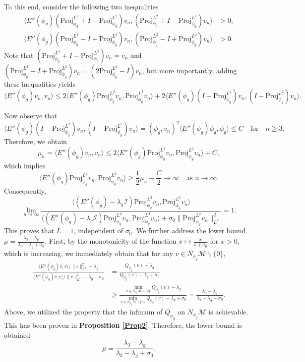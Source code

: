 \documentclass[preprint,3p]{elsarticle}
\begin{document}
To this end, consider the following two inequalities
\begin{align*}
	\langle E''(\phi_g) (\text{Proj}_{\phi_g}^{L^2} + I - \text{Proj}_{\phi_g}^{L^2}) v_n, (\text{Proj}_{\phi_g}^{L^2} + I - \text{Proj}_{\phi_g}^{L^2}) v_n \rangle &> 0, \\
	\langle E''(\phi_g) (\text{Proj}_{\phi_g}^{L^2} - I + \text{Proj}_{\phi_g}^{L^2}) v_n, (\text{Proj}_{\phi_g}^{L^2} - I + \text{Proj}_{\phi_g}^{L^2}) v_n \rangle &> 0.
\end{align*}
Note that $(\text{Proj}_{\phi_g}^{L^2} + I - \text{Proj}_{\phi_g}^{L^2})v_n = v_n$ and $(\text{Proj}_{\phi_g}^{L^2} - I + \text{Proj}_{\phi_g}^{L^2})v_n = (2\text{Proj}_{\phi_g}^{L^2} - I)v_n$, but more importantly, adding these inequalities yields
\[
\langle E''(\phi_g) v_n, v_n \rangle \leq 2 \langle E''(\phi_g) \text{Proj}_{\phi_g}^{L^2} v_n, \text{Proj}_{\phi_g}^{L^2} v_n \rangle + 2 \langle E''(\phi_g) (I - \text{Proj}_{\phi_g}^{L^2}) v_n, (I - \text{Proj}_{\phi_g}^{L^2}) v_n \rangle.
\]

Now observe that
\[
\langle E''(\phi_g) (I - \text{Proj}_{\phi_g}^{L^2}) v_n, (I - \text{Proj}_{\phi_g}^{L^2}) v_n \rangle = (\phi_g, v_n)^2 \langle E''(\phi_g) \phi_g, \phi_g \rangle\le C\quad \text{for}\quad n\ge3.
\]
Therefore, we obtain
\[
\mu_n = \langle E''(\phi_g) v_n, v_n \rangle \leq 2 \langle E''(\phi_g) \text{Proj}_{\phi_g}^{L^2} v_n, \text{Proj}_{\phi_g}^{L^2} v_n \rangle + C,
\]
which implies
\[
\langle E''(\phi_g) \text{Proj}_{\phi_g}^{L^2} v_n, \text{Proj}_{\phi_g}^{L^2} v_n \rangle \geq \frac{1}{2} \mu_n - \frac{C}{2} \to \infty \quad \text{as } n \to \infty.
\]
Consequently,
\[
\lim_{n \to \infty} \frac{\langle (E''(\phi_g) - \lambda_g \mathcal{I}) \text{Proj}_{\phi_g}^{L^2} v_n, \text{Proj}_{\phi_g}^{L^2} v_n \rangle}{\langle (E''(\phi_g) - \lambda_g \mathcal{I}) \text{Proj}_{\phi_g}^{L^2} v_n, \text{Proj}_{\phi_g}^{L^2} v_n \rangle + \sigma_0 \|\text{Proj}_{\phi_g}^{L^2} v_n\|_{L^2}^2} = 1.
\]
This proves that $L = 1$, independent of $\sigma_0$. We further address the lower bound $\mu = \frac{\lambda_3 - \lambda_g}{\lambda_3 - \lambda_g + \sigma_0}$. First, by the monotonicity of the function $x \mapsto \frac{x}{x + \sigma_0}$ for $x > 0$, which is {increasing}, we immediately obtain that for any $v \in N_{\phi_g}\mathcal{M}\backslash\{0\}$,
\begin{align*}
	\frac{\langle E''(\phi_g) v, v \rangle/\|v\|^2_{L^2}- \lambda_g }{\langle E''(\phi_g)  v, v \rangle/\|v\|^2_{L^2} - \lambda_g + \sigma_0}&=\frac{Q_{\phi_g}(v)- \lambda_g }{Q_{\phi_g}(v) - \lambda_g + \sigma_0}\\ 
	&\ge 
	\frac{\min\limits_{v \in N_{\phi_g}\mathcal{M}\backslash\{0\}} Q_{\phi_g}(v)- \lambda_g}{\min\limits_{v \in N_{\phi_g}\mathcal{M}\backslash\{0\}} Q_{\phi_g}(v) - \lambda_g + \sigma_0}=\frac{\lambda_3 - \lambda_g}{\lambda_3 - \lambda_g + \sigma_0}.
\end{align*}
Above, we utilized the property that the infimum of $Q_{\phi_g} $ on $N_{\phi_g}\mathcal{M}$ is achievable. This has been proven in {\bf Proposition \ref{Prop2}}. Therefore, the lower bound is obtained
\[
\mu = \frac{\lambda_3 - \lambda_g}{\lambda_3 - \lambda_g + \sigma_0}.
\]
\end{document}
